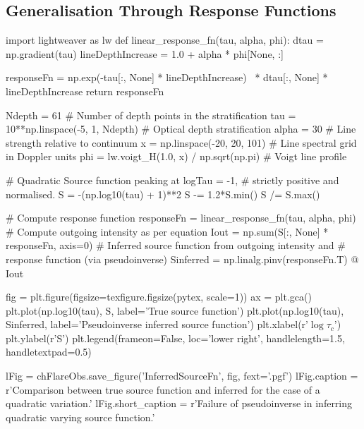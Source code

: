 \subsection{Generalisation Through Response Functions}\label{Sec:IntroRfs}

\begin{pycode}[FlareObs]
import lightweaver as lw
def linear_response_fn(tau, alpha, phi):
    dtau = np.gradient(tau)
    lineDepthIncrease = 1.0 + alpha * phi[None, :]

    responseFn = np.exp(-tau[:, None] * lineDepthIncrease) \
                  * dtau[:, None] * lineDepthIncrease
    return responseFn

Ndepth = 61 # Number of depth points in the stratification
tau = 10**np.linspace(-5, 1, Ndepth) # Optical depth stratification
alpha = 30 # Line strength relative to continuum
x = np.linspace(-20, 20, 101) # Line spectral grid in Doppler units
phi = lw.voigt_H(1.0, x) / np.sqrt(np.pi) # Voigt line profile

# Quadratic Source function peaking at logTau = -1,
# strictly positive and normalised.
S = -(np.log10(tau) + 1)**2
S -= 1.2*S.min()
S /= S.max()

# Compute response function
responseFn = linear_response_fn(tau, alpha, phi)
# Compute outgoing intensity as per equation
Iout = np.sum(S[:, None] * responseFn, axis=0)
# Inferred source function from outgoing intensity and
# response function (via pseudoinverse)
Sinferred = np.linalg.pinv(responseFn.T) @ Iout

fig = plt.figure(figsize=texfigure.figsize(pytex, scale=1))
ax = plt.gca()
plt.plot(np.log10(tau), S, label='True source function')
plt.plot(np.log10(tau), Sinferred, label='Pseudoinverse inferred source function')
plt.xlabel(r'$\log\tau_c$')
plt.ylabel(r'S')
plt.legend(frameon=False, loc='lower right', handlelength=1.5, handletextpad=0.5)

lFig = chFlareObs.save_figure('InferredSourceFn', fig, fext='.pgf')
lFig.caption = r'Comparison between true source function and inferred for the case of a quadratic variation.'
lFig.short_caption = r'Failure of pseudoinverse in inferring quadratic varying source function.'
\end{pycode}



